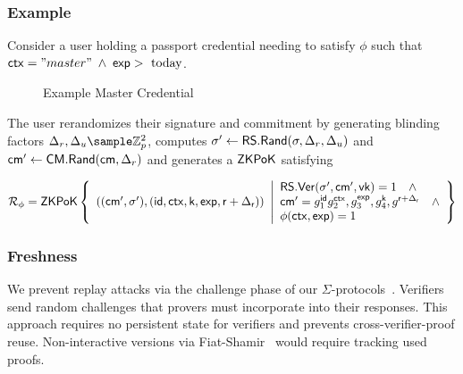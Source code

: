 \subsubsection{Example}
Consider a user holding a passport credential needing to satisfy $\phi$ such that $\mathsf{ctx}="master" \; \wedge \; \mathsf{exp} > \text{ today}$. 

\begin{figure}[H]
        \begin{pchstack}[boxed, center, space=4em]
            \begin{pcvstack}
            \end{pcvstack}
        \end{pchstack}
    \caption{Example Master Credential}
    \label{fig:master-cred}
\end{figure}

The user rerandomizes their signature and commitment by generating blinding factors $\Delta_r, \Delta_u \sample \Z_p^2$, computes $\sigma' \gets \mathsf{RS.Rand}(\sigma, \Delta_r, \Delta_u)$ and $\mathsf{cm}' \gets \mathsf{CM.Rand}(\mathsf{cm}, \Delta_r)$ and generates a ${\mathsf{ZKPoK}}$ satisfying 

     \[
    \mathcal{R}_\phi = {\mathsf{ZKPoK}} \left\{ 
    \begin{array}{l} 
    ((\mathsf{cm}', \sigma'),(\mathsf{id}, \mathsf{ctx}, \mathsf{k}, \mathsf{exp}, \mathsf{r}+\Delta_{\mathsf{r}})) \\
    \end{array} 
    \middle|
    \begin{array}{l}
    \mathsf{RS.Ver}(\sigma', \mathsf{cm}', \mathsf{vk}) = 1 \quad \wedge \\
    \mathsf{cm}' = g_1^{\mathsf{id}}g_2^{\mathsf{ctx}},g_3^{\mathsf{exp}},g_4^{\mathsf{k}}, g^{\mathsf{r}+\Delta_{\mathsf{r}}} \quad \wedge  \\
    \phi(\mathsf{ctx}, \mathsf{exp}) = 1
    \end{array} 
    \right\}
    \]




\subsubsection{Freshness}
We prevent replay attacks via the challenge phase of our $\Sigma$-protocols~\cite{desmedt_proofs_1994, damgard_sigma_2010}. Verifiers send random challenges that provers must incorporate into their responses. This approach requires no persistent state for verifiers and prevents cross-verifier-proof reuse. Non-interactive versions via Fiat-Shamir~\cite{odlyzko_how_1986} would require tracking used proofs.

